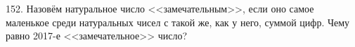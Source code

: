 152. Назовём натуральное число <<замечательным>>, если оно самое маленькое среди натуральных чисел с такой же, как у него, суммой цифр. Чему равно 2017-е <<замечательное>> число?\\
